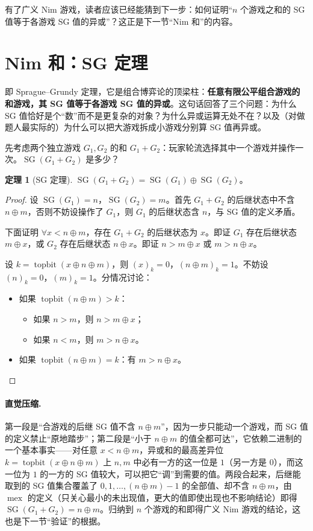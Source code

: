 \documentclass[UTF8,a4paper,11pt,oneside,openany,fontset=fandol]{ctexbook}
\theoremstyle{definition}
\newtheorem{theorem}[definition]{定理}
\newcommand{\mex}{\operatorname{mex}}
\newcommand{\SG}{\operatorname{SG}}
\newcommand{\topbit}{\operatorname{topbit}}
\begin{document}
有了广义 Nim 游戏，读者应该已经能猜到下一步：如何证明“$n$ 个游戏之和的 SG 值等于各游戏 SG 值的异或”？这正是下一节“Nim 和”的内容。

\section{Nim 和：SG 定理}
即 Sprague--Grundy 定理，它是组合博弈论的顶梁柱：\textbf{任意有限公平组合游戏的和游戏，其 SG 值等于各游戏 SG 值的异或}。这句话回答了三个问题：为什么 SG 值恰好是个“数”而不是更复杂的对象？为什么异或运算无处不在？以及（对做题人最实际的）为什么可以把大游戏拆成小游戏分别算 SG 值再异或。

先考虑两个独立游戏 $G_1,G_2$ 的和 $G_1+G_2$：玩家轮流选择其中一个游戏并操作一次。$\SG(G_1+G_2)$ 是多少？

\begin{theorem}[SG 定理]\label{thm:sgtheorem}
$\SG(G_1+G_2)=\SG(G_1)\oplus\SG(G_2)$。
\end{theorem}
\begin{proof}
设 $\SG(G_1)=n$，$\SG(G_2)=m$。首先 $G_1+G_2$ 的后继状态中不含 $n\oplus m$，否则不妨设操作了 $G_1$，则 $G_1$ 的后继状态含 $n$，与 SG 值的定义矛盾。

下面证明 $\forall x<n\oplus m$，存在 $G_1+G_2$ 的后继状态为 $x$。即证 $G_1$ 存在后继状态 $m\oplus x$，或 $G_2$ 存在后继状态 $n\oplus x$。即证 $n>m\oplus x$ 或 $m>n\oplus x$。

设 $k=\topbit(x\oplus n\oplus m)$，则 $(x)_k=0$，$(n\oplus m)_k=1$。不妨设 $(n)_k=0$，$(m)_k=1$。分情况讨论：
\begin{itemize}
\item 如果 $\topbit(n\oplus m)>k$：
\begin{itemize}
\item 如果 $n>m$，则 $n>m\oplus x$；
\item 如果 $n<m$，则 $m>n\oplus x$。
\end{itemize}
\item 如果 $\topbit(n\oplus m)=k$：有 $m>n\oplus x$。
\end{itemize}
\end{proof}

\paragraph{直觉压缩.} 第一段是“合游戏的后继 SG 值不含 $n\oplus m$”，因为一步只能动一个游戏，而 SG 值的定义禁止“原地踏步”；第二段是“小于 $n\oplus m$ 的值全都可达”，它依赖二进制的一个基本事实——对任意 $x<n\oplus m$，异或和的最高差异位 $k=\topbit(x\oplus n\oplus m)$ 上 $n,m$ 中必有一方的这一位是 $1$（另一方是 $0$），而这一位为 $1$ 的一方的 SG 值较大，可以把它“调”到需要的值。两段合起来，后继能取到的 SG 值集合覆盖了 $0,1,\ldots,(n\oplus m)-1$ 的全部值、却不含 $n\oplus m$，由 $\mex$ 的定义（只关心最小的未出现值，更大的值即使出现也不影响结论）即得 $\SG(G_1+G_2)=n\oplus m$。归纳到 $n$ 个游戏的和即得广义 Nim 游戏的结论，这也是下一节“验证”的根据。
\end{document}
